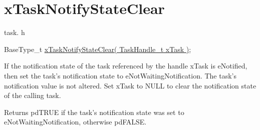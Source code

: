 \hypertarget{group__xTaskNotifyStateClear}{\section{x\-Task\-Notify\-State\-Clear}
\label{group__xTaskNotifyStateClear}
}
task. h 
\begin{DoxyPre}BaseType\_t \hyperlink{task_8h_a4cb6c908a9d2d733e9d519d7dc27bb34}{xTaskNotifyStateClear( TaskHandle\_t xTask )};\end{DoxyPre}


If the notification state of the task referenced by the handle x\-Task is e\-Notified, then set the task's notification state to e\-Not\-Waiting\-Notification. The task's notification value is not altered. Set x\-Task to N\-U\-L\-L to clear the notification state of the calling task.

\begin{DoxyReturn}{Returns}
pd\-T\-R\-U\-E if the task's notification state was set to e\-Not\-Waiting\-Notification, otherwise pd\-F\-A\-L\-S\-E. 
\end{DoxyReturn}
